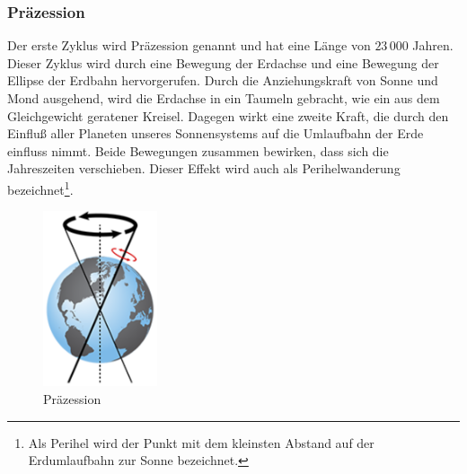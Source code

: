 \begin{refsection}
\subsubsection{Präzession}
Der erste Zyklus wird Präzession genannt und hat eine Länge von
$23\,000$ Jahren. Dieser Zyklus wird durch eine Bewegung der Erdachse
und eine Bewegung der Ellipse der Erdbahn hervorgerufen. Durch die
Anziehungskraft von Sonne und Mond ausgehend, wird die Erdachse
in ein Taumeln gebracht, wie ein aus dem Gleichgewicht geratener
Kreisel. Dagegen wirkt eine zweite Kraft, die durch den Einfluß
aller Planeten unseres Sonnensystems auf die Umlaufbahn der Erde
einfluss nimmt. Beide Bewegungen zusammen bewirken, dass sich die
Jahreszeiten verschieben. Dieser Effekt wird auch als Perihelwanderung
bezeichnet\footnote{Als Perihel wird der Punkt mit dem kleinsten
Abstand auf der Erdumlaufbahn zur Sonne bezeichnet.}.
%
\begin{figure}
	\centering
	\includegraphics[width= 0.3\textwidth]{neigung/Precession.png}
	\caption[Präzession]{Präzession}
	\label{fig:abb}
\end{figure}


\end{refsection}
